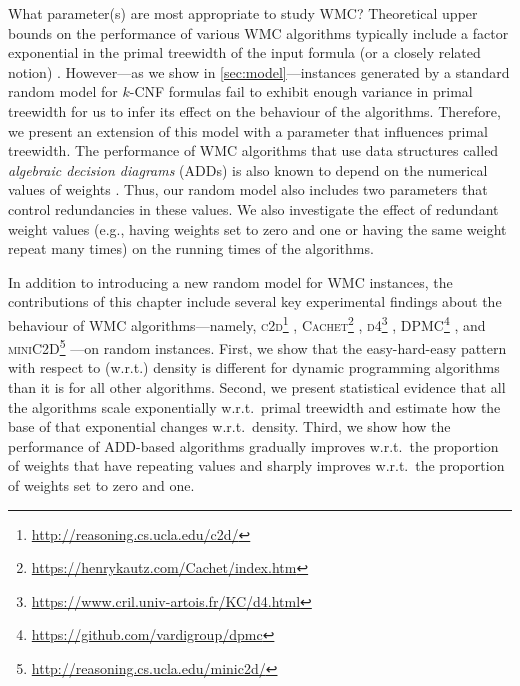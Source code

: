 What parameter(s) are most appropriate to study WMC\@? Theoretical upper bounds
on the performance of various WMC algorithms typically include a factor
exponential in the primal treewidth of the input formula (or a closely related
notion)
\citep{DBLP:journals/jair/BacchusDP09,DBLP:journals/jacm/Darwiche01,DBLP:conf/ecai/Darwiche04,DBLP:conf/sat/SangBBKP04}.
However---as we show in \cref{sec:model}---instances generated by a standard
random model for $k$-CNF formulas fail to exhibit enough variance in primal
treewidth for us to infer its effect on the behaviour of the algorithms.
Therefore, we present an extension of this model with a parameter that
influences primal treewidth. The performance of WMC algorithms that use data
structures called \emph{algebraic decision diagrams} (ADDs)
\citep{DBLP:journals/fmsd/BaharFGHMPS97} is also known to depend on the
numerical values of weights
\citep{DBLP:conf/aaai/DudekPV20,DBLP:conf/cp/DudekPV20}. Thus, our random model
also includes two parameters that control redundancies in these values. We also
investigate the effect of redundant weight values (e.g., having weights set to
zero and one or having the same weight repeat many times) on the running times
of the algorithms.

In addition to introducing a new random model for WMC instances, the
contributions of this chapter include several key experimental findings about
the behaviour of WMC algorithms---namely,
\textsc{c2d}\footnote{\url{http://reasoning.cs.ucla.edu/c2d/}}
\citep{DBLP:conf/ecai/Darwiche04},
\textsc{Cachet}\footnote{\url{https://henrykautz.com/Cachet/index.htm}}
\citep{DBLP:conf/sat/SangBBKP04},
\textsc{d4}\footnote{\url{https://www.cril.univ-artois.fr/KC/d4.html}}
\citep{DBLP:conf/ijcai/LagniezM17},
\textsc{DPMC}\footnote{\url{https://github.com/vardigroup/dpmc}}
\citep{DBLP:conf/cp/DudekPV20}, and
\textsc{miniC2D}\footnote{\url{http://reasoning.cs.ucla.edu/minic2d/}}
\citep{DBLP:conf/ijcai/OztokD15}---on random instances. First, we show that the
easy-hard-easy pattern with respect to (w.r.t.) density is different for dynamic
programming algorithms than it is for all other algorithms. Second, we present
statistical evidence that all the algorithms scale exponentially w.r.t.\ primal
treewidth and estimate how the base of that exponential changes w.r.t.\ density.
Third, we show how the performance of ADD-based algorithms gradually improves
w.r.t.\ the proportion of weights that have repeating values and sharply improves
w.r.t.\ the proportion of weights set to zero and one.

